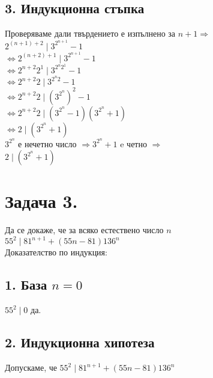 \documentclass[10pt]{article}
\begin{document}
\subsection*{3. Индукционна стъпка}
Проверяваме дали твърдението е изпълнено за $n+1 \Rightarrow$\\
$2^{(n + 1) + 2} \mid 3^{2^{n + 1}} - 1$\\
$\Leftrightarrow 2^{(n + 2) + 1} \mid 3^{2^{n + 1}} - 1$\\
$\Leftrightarrow 2^{n + 2}2^1 \mid 3^{2^n2^1} - 1$\\
$\Leftrightarrow 2^{n + 2}2 \mid 3^{2^n2} - 1$\\
$\Leftrightarrow 2^{n + 2}2 \mid (3^{2^n})^2 - 1$\\
$\Leftrightarrow 2^{n + 2}2 \mid (3^{2^n} - 1)(3^{2^n} + 1)$\\
$\Leftrightarrow 2 \mid (3^{2^n} + 1)$\\
$3^{2^n}$ е нечетно число $\Rightarrow 3^{2^n} + 1$ e четно $\Rightarrow$\\
$2 \mid (3^{2^n} + 1)$

\section*{Задача 3.}
Да се докаже, че за всяко естествено число $n$\\
$55^2 \mid 81^{n+1} + (55n -81)136^n$\\
Доказателство по индукция:\\
\subsection*{1. База $n = 0$}
$55^2 \mid 0$ да.
\subsection*{2. Индукционна хипотеза}
Допускаме, че $55^2 \mid 81^{n+1} + (55n -81)136^n$
\end{document}
